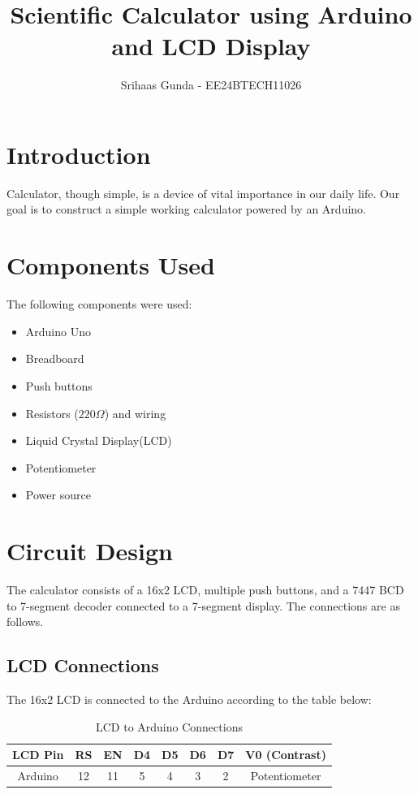 \documentclass{article}
\title{Scientific Calculator using Arduino and LCD Display}
\author{Srihaas Gunda - EE24BTECH11026}
\date{}
\begin{document}
\maketitle

\tableofcontents
\newpage

\section{Introduction}
Calculator, though simple, is a device of vital importance in our daily life. Our goal is to construct a simple working calculator powered by an Arduino.

\section{Components Used}
The following components were used:
\begin{itemize}
    \item Arduino Uno
    \item Breadboard
    \item Push buttons 
    \item Resistors ($220\Omega$) and wiring
    \item Liquid Crystal Display(LCD)
    \item Potentiometer
    \item Power source
\end{itemize}

\newpage
\section{Circuit Design}

The calculator consists of a 16x2 LCD, multiple push buttons, and a 7447 BCD to 7-segment decoder connected to a 7-segment display. The connections are as follows.

\subsection{LCD Connections}
The 16x2 LCD is connected to the Arduino according to the table below:

\begin{table}[h]
    \centering
    \begin{tabular}{|c|c|c|c|c|c|c|c|}
        \hline
        LCD Pin & RS  & EN  & D4  & D5  & D6  & D7  & V0 (Contrast) \\ \hline
        Arduino & 12  & 11  & 5  & 4  & 3  & 2  & Potentiometer \\ \hline
    \end{tabular}
    \caption{LCD to Arduino Connections}
\end{table}
\end{document}
